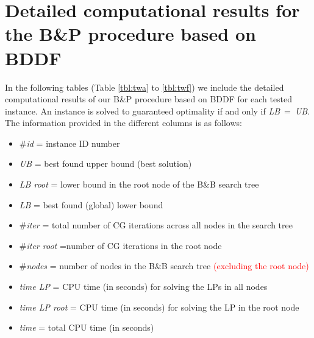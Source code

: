 \documentclass{informs3-noredtextontop}
\theoremstyle{TH}
\newcommand*{\red}{\textcolor{red}}
\begin{document}
\section{Detailed computational results for the B\&P procedure based on BDDF} \label{app:details}
In the following tables (Table \ref{tbl:twa} to \ref{tbl:twf}) we include the detailed computational results of our  B\&P procedure based on BDDF for each tested instance.  An instance is solved to guaranteed optimality if and only if \mbox{\emph{LB} = \emph{UB}}\@. The information provided in the different columns is as follows:
\begin{itemize}
\item \#\emph{id} = instance ID number
\item \emph{UB} = best found upper bound (best solution)
\item \emph{LB root} = lower bound in the root node of the B\&B search tree
\item \emph{LB} = best found (global) lower bound
\item \#\emph{iter} = total number of CG iterations across all nodes in the search tree
\item \#\emph{iter root} =number of CG iterations in the root node
\item \#\emph{nodes}  = number of nodes in the B\&B search tree \red{(excluding the root node)}
\item \emph{time LP} = CPU time (in seconds) for solving the LPs in all nodes
\item \emph{time LP root} = CPU time (in seconds) for solving the LP in the root node
\item \emph{time} = total CPU time (in seconds)
\end{itemize}
\end{document}
